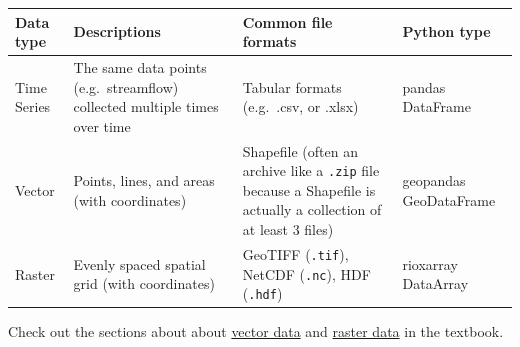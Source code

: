 \documentclass[
  letterpaper,
  DIV=11,
  numbers=noendperiod,
  oneside]{scrreprt}
\begin{document}
\begin{longtable}[]{@{}
  >{\raggedright\arraybackslash}p{}
  >{\raggedright\arraybackslash}p{}
  >{\raggedright\arraybackslash}p{}
  >{\raggedright\arraybackslash}p{}@{}}
\toprule\noalign{}
\begin{minipage}[b]{\linewidth}\raggedright
Data type
\end{minipage} & \begin{minipage}[b]{\linewidth}\raggedright
Descriptions
\end{minipage} & \begin{minipage}[b]{\linewidth}\raggedright
Common file formats
\end{minipage} & \begin{minipage}[b]{\linewidth}\raggedright
Python type
\end{minipage} \\
\midrule\noalign{}
\endhead
\bottomrule\noalign{}
\endlastfoot
Time Series & The same data points (e.g.~streamflow) collected multiple
times over time & Tabular formats (e.g.~.csv, or .xlsx) & pandas
DataFrame \\
Vector & Points, lines, and areas (with coordinates) & Shapefile (often
an archive like a \texttt{.zip} file because a Shapefile is actually a
collection of at least 3 files) & geopandas GeoDataFrame \\
Raster & Evenly spaced spatial grid (with coordinates) & GeoTIFF
(\texttt{.tif}), NetCDF (\texttt{.nc}), HDF (\texttt{.hdf}) & rioxarray
DataArray \\
\end{longtable}

\begin{tcolorbox}[enhanced jigsaw, colbacktitle=quarto-callout-color!10!white, opacityback=0, bottomtitle=1mm, toptitle=1mm, bottomrule=.15mm, left=2mm, colframe=quarto-callout-color-frame, leftrule=.75mm, opacitybacktitle=0.6, colback=white, rightrule=.15mm, toprule=.15mm, breakable, titlerule=0mm, title=\textcolor{quarto-callout-color}{\faInfo}\hspace{0.5em}{Read More}, coltitle=black, arc=.35mm]

Check out the sections about about
\href{https://www.earthdatascience.org/courses/use-data-open-source-python/intro-vector-data-python/spatial-data-vector-shapefiles/}{vector
data} and
\href{https://www.earthdatascience.org/courses/intro-to-earth-data-science/file-formats/use-spatial-data/use-raster-data/}{raster
data} in the textbook.

\end{tcolorbox}
\end{document}
